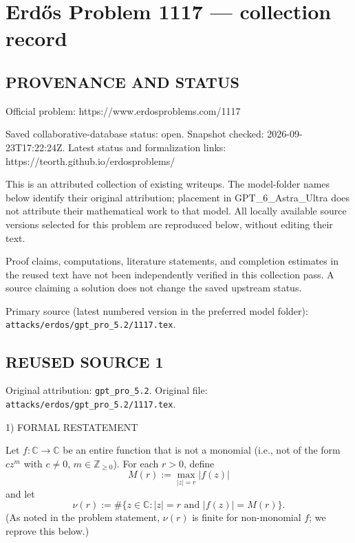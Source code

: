 \section*{Erd\H{o}s Problem 1117 --- collection record}

\subsection*{PROVENANCE AND STATUS}
Official problem: https://www.erdosproblems.com/1117

Saved collaborative-database status: open.
Snapshot checked: 2026-09-23T17:22:24Z.
Latest status and formalization links: https://teorth.github.io/erdosproblems/

This is an attributed collection of existing writeups. The model-folder names below identify their original attribution; placement in GPT\_6\_Astra\_Ultra does not attribute their mathematical work to that model. All locally available source versions selected for this problem are reproduced below, without editing their text.

Proof claims, computations, literature statements, and completion estimates in the reused text have not been independently verified in this collection pass. A source claiming a solution does not change the saved upstream status.

Primary source (latest numbered version in the preferred model folder): \texttt{attacks/erdos/gpt\_pro\_5.2/1117.tex}.

\subsection*{REUSED SOURCE 1}
Original attribution: \texttt{gpt\_pro\_5.2}.
Original file: \texttt{attacks/erdos/gpt\_pro\_5.2/1117.tex}.


1) FORMAL RESTATEMENT

Let \(f:\mathbb{C}\to\mathbb{C}\) be an entire function that is not a monomial (i.e., not of the form \(c z^m\) with \(c\ne 0\), \(m\in\mathbb{Z}_{\ge 0}\)). For each \(r>0\), define
\[
M(r):=\max_{|z|=r} |f(z)|
\]
and let
\[
\nu(r):=\#\{z\in\mathbb{C}: |z|=r\text{ and }|f(z)|=M(r)\}.
\]
(As noted in the problem statement, \(\nu(r)\) is finite for non-monomial \(f\); we reprove this below.)

